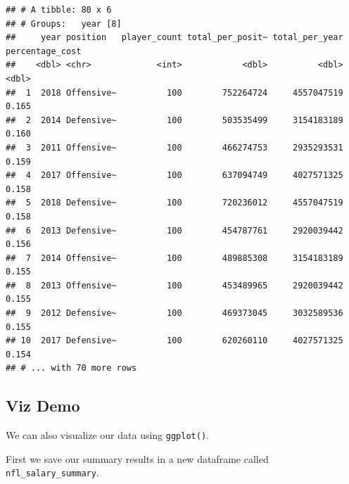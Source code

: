 \documentclass[
]{book}
\newenvironment{Shaded}{\begin{snugshade}}{\end{snugshade}}
\newcommand{\DataTypeTok}[1]{\textcolor[rgb]{0.13,0.29,0.53}{#1}}
\newcommand{\KeywordTok}[1]{\textcolor[rgb]{0.13,0.29,0.53}{\textbf{#1}}}
\newcommand{\NormalTok}[1]{#1}
\newcommand{\OperatorTok}[1]{\textcolor[rgb]{0.81,0.36,0.00}{\textbf{#1}}}
\newcommand{\StringTok}[1]{\textcolor[rgb]{0.31,0.60,0.02}{#1}}
\begin{document}
\begin{verbatim}
## # A tibble: 80 x 6
## # Groups:   year [8]
##     year position   player_count total_per_posit~ total_per_year percentage_cost
##    <dbl> <chr>             <int>            <dbl>          <dbl>           <dbl>
##  1  2018 Offensive~          100        752264724     4557047519           0.165
##  2  2014 Defensive~          100        503535499     3154183189           0.160
##  3  2011 Offensive~          100        466274753     2935293531           0.159
##  4  2017 Offensive~          100        637094749     4027571325           0.158
##  5  2018 Defensive~          100        720236012     4557047519           0.158
##  6  2013 Defensive~          100        454787761     2920039442           0.156
##  7  2014 Offensive~          100        489885308     3154183189           0.155
##  8  2013 Offensive~          100        453489965     2920039442           0.155
##  9  2012 Defensive~          100        469373045     3032589536           0.155
## 10  2017 Defensive~          100        620260110     4027571325           0.154
## # ... with 70 more rows
\end{verbatim}

\hypertarget{viz-demo-1}{%
\subsection{Viz Demo}\label{viz-demo-1}}

We can also visualize our data using \texttt{ggplot()}.

First we save our summary results in a new dataframe called \texttt{nfl\_salary\_summary}.

\begin{Shaded}
\end{Shaded}
\end{document}

